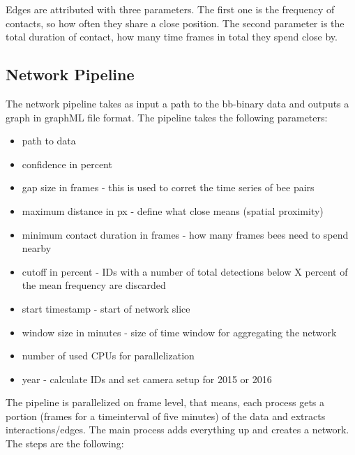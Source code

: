 Edges are attributed with three parameters. The first one is the frequency of contacts, so how often they share a close position. The second parameter is the total duration of contact, how many time frames in total they spend close by.

\subsection{Network Pipeline}

The network pipeline takes as input a path to the bb-binary data and outputs a graph in graphML file format. The pipeline takes the following parameters:

\begin{itemize}
\item path to data
\item confidence in percent
\item gap size in frames - this is used to corret the time series of bee pairs
\item maximum distance in px - define what close means (spatial proximity)
\item minimum contact duration in frames - how many frames bees need to spend nearby
\item cutoff in percent - IDs with a number of total detections below X percent of the mean frequency are discarded 
\item start timestamp - start of network slice
\item window size in minutes - size of time window for aggregating the network
\item number of used CPUs for parallelization
\item year - calculate IDs and set camera setup for 2015 or 2016
\end{itemize}

The pipeline is parallelized on frame level, that means, each process gets a portion (frames for a timeinterval of five minutes) of the data and extracts interactions/edges. The main process adds everything up and creates a network.
The steps are the following:

